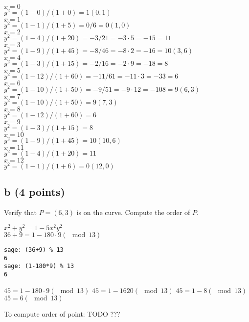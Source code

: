 \documentclass{article}
\begin{document}
$x = 0$ \\
$y^2 = (1-0)/(1+0) = 1                                   (0, 1)$ \\
$x = 1$ \\
$y^2 = (1-1)/(1+5) = 0/6 = 0                             (1, 0)$ \\
$x = 2$ \\
$y^2 = (1-4)/(1+20) = -3/21 = -3 \cdot 5 = -15 = 11$ \\
$x = 3$ \\
$y^2 = (1-9)/(1+45) = -8/46 = -8 \cdot 2 = -16 = 10           (3, 6)$ \\
$x = 4$ \\
$y^2 = (1-3)/(1+15) = -2/16 = -2 \cdot 9 = -18 = 8$ \\
$x = 5$ \\
$y^2 = (1-12)/(1+60) = -11/61 = -11 \cdot 3 = -33 = 6$ \\
$x = 6$ \\
$y^2 = (1-10)/(1+50) = -9/51 = -9 \cdot 12 = -108 = 9         (6, 3)$ \\
$x = 7$ \\
$y^2 = (1-10)/(1+50) = 9                                (7, 3)$ \\
$x = 8$ \\
$y^2 = (1-12)/(1+60) = 6$ \\
$x = 9$ \\
$y^2 = (1-3)/(1+15) = 8$ \\
$x = 10$ \\
$y^2 = (1-9)/(1+45) = 10                                (10, 6)$ \\
$x = 11$ \\
$y^2 = (1-4)/(1+20) = 11$ \\
$x = 12$ \\
$y^2 = (1-1)/(1+6) = 0                                  (12, 0)$ \\

\subsection{b (4 points)}
Verify that $P = (6, 3)$ is on the curve. Compute the
order of $P$.

$x^2+y^2 = 1 - 5x^2y^2$ \\
$36+9 = 1 - 180 \cdot 9 (\mod 13)$
\begin{verbatim}
sage: (36+9) % 13
6
sage: (1-180*9) % 13
6
\end{verbatim}
$45 = 1 - 180 \cdot 9 (\mod 13)$
$45 = 1 - 1620 (\mod 13)$
$45 = 1 - 8 (\mod 13)$
$45 = 6 (\mod 13)$

To compute order of point:
TODO ???
\end{document}
